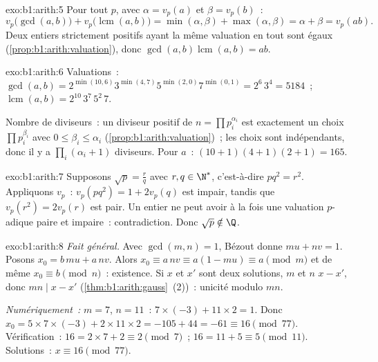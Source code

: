 \begin{solution}{exo:b1:arith:5}
Pour tout  $p$, avec $\alpha = v_p(a)$ et $\beta = v_p(b)$~:
\[
v_p\bigl(\gcd(a,b)\bigr) + v_p\bigl(\operatorname{lcm}(a,b)\bigr)
= \min(\alpha, \beta) + \max(\alpha, \beta)
= \alpha + \beta = v_p(ab) .
\]
Deux entiers strictement positifs ayant la même valuation en tout  sont égaux
(\cref{prop:b1:arith:valuation}), donc $\gcd(a,b)\operatorname{lcm}(a,b)
= ab$.
\end{solution}

\begin{solution}{exo:b1:arith:6}
Valuations~: $\gcd(a, b) = 2^{\min(10,6)} 3^{\min(4,7)} 5^{\min(2,0)}
7^{\min(0,1)} = 2^6\, 3^4 = 5184$~;
$\operatorname{lcm}(a,b) = 2^{10}\, 3^7\, 5^2\, 7$.

Nombre de diviseurs~: un diviseur positif de $n = \prod p_i^{\alpha_i}$ est
exactement un choix $\prod p_i^{\beta_i}$ avec $0 \leq \beta_i \leq
\alpha_i$ (\cref{prop:b1:arith:valuation})~; les choix sont
indépendants, donc il y a $\prod_i (\alpha_i + 1)$ diviseurs. Pour $a$~:
$(10+1)(4+1)(2+1) = 165$.
\end{solution}

\begin{solution}{exo:b1:arith:7}
Supposons $\sqrt p = \frac rq$ avec $r, q \in \N^*$, c'est-à-dire $p q^2 =
r^2$. Appliquons $v_p$~: $v_p(pq^2) = 1 + 2v_p(q)$ est impair, tandis que $v_p(r^2)
= 2 v_p(r)$ est pair. Un entier ne peut avoir à la fois une valuation
$p$-adique paire et impaire~: contradiction. Donc $\sqrt p \notin \Q$.
\end{solution}

\begin{solution}{exo:b1:arith:8}
\emph{Fait général.} Avec $\gcd(m,n) = 1$, Bézout donne $mu + nv = 1$.
Posons $x_0 = b\,mu + a\,nv$. Alors $x_0 \equiv a\,nv \equiv a(1 - mu)
\equiv a \pmod m$ et de même $x_0 \equiv b \pmod n$~: existence. Si
$x$ et $x'$ sont deux solutions, $m$ et $n$  $x - x'$, donc
$mn \mid x - x'$ (\cref{thm:b1:arith:gauss}~(2))~: unicité modulo
$mn$.

\emph{Numériquement~:} $m = 7$, $n = 11$~: $7 \times (-3) + 11 \times 2 =
1$. Donc $x_0 = 5 \times 7 \times (-3) + 2 \times 11 \times 2 = -105 +
44 = -61 \equiv 16 \pmod{77}$. Vérification~: $16 = 2\times 7 + 2 \equiv 2
\pmod 7$~; $16 = 11 + 5 \equiv 5 \pmod{11}$. Solutions~: $x \equiv 16
\pmod{77}$.
\end{solution}

